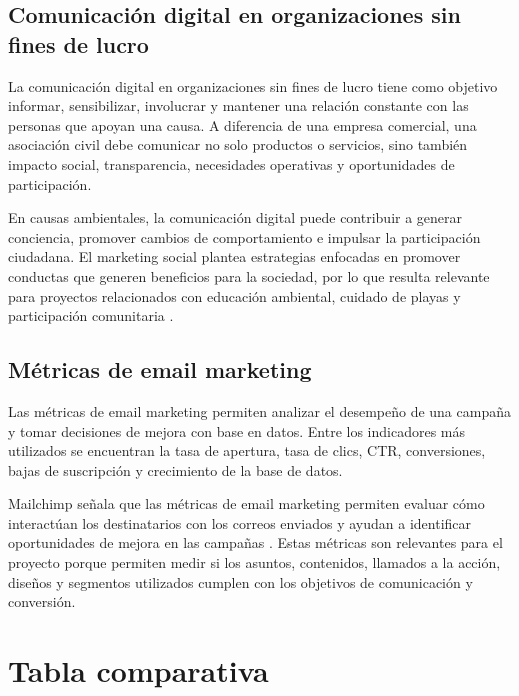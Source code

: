 \subsection{Comunicación digital en organizaciones sin fines de lucro}

La comunicación digital en organizaciones sin fines de lucro tiene como objetivo informar, sensibilizar, involucrar y mantener una relación constante con las personas que apoyan una causa. A diferencia de una empresa comercial, una asociación civil debe comunicar no solo productos o servicios, sino también impacto social, transparencia, necesidades operativas y oportunidades de participación.

En causas ambientales, la comunicación digital puede contribuir a generar conciencia, promover cambios de comportamiento e impulsar la participación ciudadana. El marketing social plantea estrategias enfocadas en promover conductas que generen beneficios para la sociedad, por lo que resulta relevante para proyectos relacionados con educación ambiental, cuidado de playas y participación comunitaria \cite{kotler_lee_social_marketing}.

\subsection{Métricas de email marketing}

Las métricas de email marketing permiten analizar el desempeño de una campaña y tomar decisiones de mejora con base en datos. Entre los indicadores más utilizados se encuentran la tasa de apertura, tasa de clics, CTR, conversiones, bajas de suscripción y crecimiento de la base de datos.

Mailchimp señala que las métricas de email marketing permiten evaluar cómo interactúan los destinatarios con los correos enviados y ayudan a identificar oportunidades de mejora en las campañas \cite{mailchimp_benchmarks}. Estas métricas son relevantes para el proyecto porque permiten medir si los asuntos, contenidos, llamados a la acción, diseños y segmentos utilizados cumplen con los objetivos de comunicación y conversión.

\section{Tabla comparativa}

